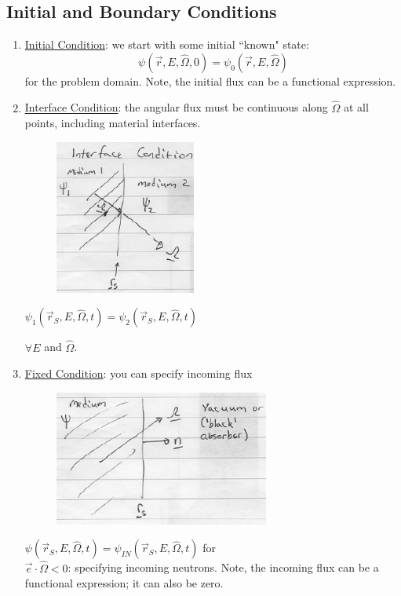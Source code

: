 \documentclass[12pt]{article}
\newcommand{\vOmega}{\ensuremath{\hat{\Omega}}}
\begin{document}
\subsection*{Initial and Boundary Conditions}
\begin{enumerate}
\item \underline{Initial Condition}: we start with some initial ``known" state:
\[\psi(\vec{r}, E, \vOmega, 0) = \psi_0(\vec{r}, E, \vOmega)\]
for the problem domain. Note, the initial flux can be a functional expression.

\item \underline{Interface Condition}: the angular flux must be continuous along $\vOmega$ at all points, including material interfaces.

\begin{minipage}{0.45\textwidth}
\begin{figure}[H]
\includegraphics[height=2in]{../figs/InterfaceCondition}
\end{figure}
\end{minipage} \hfill
\begin{minipage}{0.45\textwidth}
$\psi_1(\vec{r}_S, E, \vOmega, t) = \psi_2(\vec{r}_S, E, \vOmega, t)$

\vspace*{1 em}
$\forall E$ and $\vOmega$.
\end{minipage}

\item \underline{Fixed Condition}: you can specify incoming flux

\begin{minipage}{0.45\textwidth}
\begin{figure}[H]
\includegraphics[height=1.75in]{../figs/FreeSurfaceCondition}
\end{figure}
\end{minipage} \hfill
\begin{minipage}{0.45\textwidth}
$\psi(\vec{r}_S, E, \vOmega, t) = \psi_{IN}(\vec{r}_S, E, \vOmega, t)$ for \\$\vec{e} \cdot \vOmega < 0$: specifying incoming neutrons. Note, the incoming flux can be a functional expression; it can also be zero.


\end{minipage}
\end{enumerate}
\end{document}
